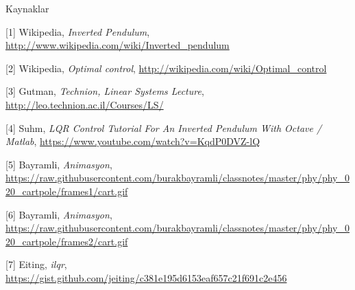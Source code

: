 \documentclass[12pt,fleqn]{article}\usepackage{../../common}
\begin{document}
Kaynaklar

[1] Wikipedia, {\em Inverted Pendulum}, \url{http://www.wikipedia.com/wiki/Inverted_pendulum}

[2] Wikipedia, {\em Optimal control}, \url{http://wikipedia.com/wiki/Optimal_control}

[3] Gutman, {\em Technion, Linear Systems Lecture}, \url{http://leo.technion.ac.il/Courses/LS/}

[4] Suhm, {\em LQR Control Tutorial For An Inverted Pendulum With Octave /
  Matlab}, \url{https://www.youtube.com/watch?v=KqdP0DVZ-lQ}

[5] Bayramli, {\em Animasyon}, \url{https://raw.githubusercontent.com/burakbayramli/classnotes/master/phy/phy_020_cartpole/frames1/cart.gif}

[6] Bayramli, {\em Animasyon}, \url{https://raw.githubusercontent.com/burakbayramli/classnotes/master/phy/phy_020_cartpole/frames2/cart.gif}

[7] Eiting, {\em ilqr}, \url{https://gist.github.com/jeiting/c381e195d6153eaf657c21f691c2e456}
\end{document}
